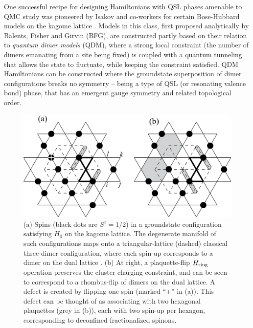 \documentclass[range]{ar2e}
\begin{document}
One successful recipe for designing Hamiltonians with QSL phases amenable to QMC study was pioneered by Isakov and co-workers for certain Bose-Hubbard models on the kagome lattice \cite{Isakov1, Isakov2, TopoEE}.  Models in this class, first proposed analytically by Balents, Fisher and Girvin \cite{BFG} (BFG),
are constructed partly based on their relation to {\it quantum dimer models} (QDM), where a strong local constraint (the number of dimers emanating from a site being fixed) is coupled with a quantum tunneling that allows the state to fluctuate, while keeping the constraint satisfied.  QDM Hamiltonians can be constructed where the groundstate superposition of dimer configurations breaks no symmetry -- being a type of QSL (or resonating valence bond) phase, that has an emergent gauge symmetry and related topological order.


\begin{figure}
\includegraphics[width=6in]{kagome}
  \caption{ (a) Spins (black dots are $S^z = 1/2$) in a groundstate configuration satisfying $H_0$ on the kagome lattice.  The degenerate manifold of such configurations maps onto a triangular-lattice (dashed) classical three-dimer configuration, where each spin-up corresponds to a dimer on the dual lattice \cite{BFG}.  (b) At right, a plaquette-flip $H_{\rm ring}$ operation preserves the cluster-charging constraint, and can be seen to correspond to a rhombus-flip of dimers on the dual lattice.  A defect is created by flipping one spin (marked ``+'' in (a)).  This defect can be thought of as associating with two hexagonal plaquettes (grey in (b)), each with two spin-up per hexagon, corresponding to deconfined fractionalized spinons.} \label{kag_fig}
\end{figure}
\end{document}
